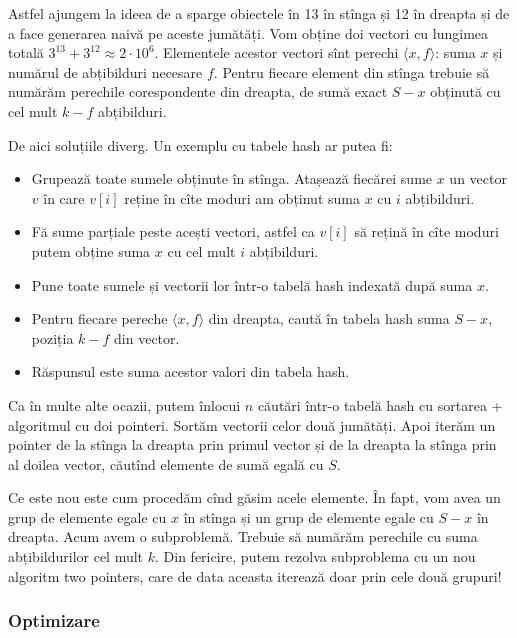 \documentclass[../main.tex]{subfiles}
\begin{document}
Astfel ajungem la ideea de a sparge obiectele în 13 în stînga și 12 în dreapta și de a face generarea naivă pe aceste jumătăți. Vom obține doi vectori cu lungimea totală $3^{13} + 3^{12} \approx 2 \cdot 10^6$. Elementele acestor vectori sînt perechi $\langle x, f \rangle$: suma $x$ și numărul de abțibilduri necesare $f$. Pentru fiecare element din stînga trebuie să numărăm perechile corespondente din dreapta, de sumă exact $S-x$ obținută cu cel mult $k-f$ abțibilduri.

De aici soluțiile diverg. Un exemplu cu tabele hash ar putea fi:

\begin{itemize}
  \item Grupează toate sumele obținute în stînga. Atașează fiecărei sume $x$ un vector $v$ în care $v[i]$ reține în cîte moduri am obținut suma $x$ cu $i$ abțibilduri.

  \item Fă sume parțiale peste acești vectori, astfel ca $v[i]$ să rețină în cîte moduri putem obține suma $x$ cu cel mult $i$ abțibilduri.

  \item Pune toate sumele și vectorii lor într-o tabelă hash indexată după suma $x$.

  \item Pentru fiecare pereche $\langle x, f \rangle$ din dreapta, caută în tabela hash suma $S-x$, poziția $k-f$ din vector.

  \item Răspunsul este suma acestor valori din tabela hash.
\end{itemize}

Ca în multe alte ocazii, putem înlocui $n$ căutări într-o tabelă hash cu sortarea + algoritmul cu doi pointeri. Sortăm vectorii celor două jumătăți. Apoi iterăm un pointer de la stînga la dreapta prin primul vector și de la dreapta la stînga prin al doilea vector, căutînd elemente de sumă egală cu $S$.

Ce este nou este cum procedăm cînd găsim acele elemente. În fapt, vom avea un grup de elemente egale cu $x$ în stînga și un grup de elemente egale cu $S-x$ în dreapta. Acum avem o subproblemă. Trebuie să numărăm perechile cu suma abțibildurilor cel mult $k$. Din fericire, putem  rezolva subproblema cu un nou algoritm two pointers, care de data aceasta iterează doar prin cele două grupuri!

\subsubsection*{Optimizare}
\end{document}
